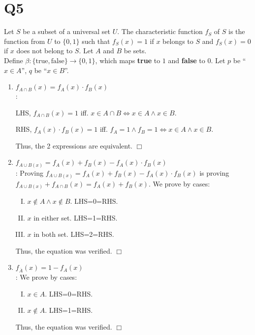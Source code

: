 \documentclass[11pt]{article}
\newenvironment{qparts}{\begin{enumerate}[{(}a{)}]}{\end{enumerate}}
\def\endproofmark{$\Box$}
\newenvironment{proof}{{\bf Proof}:}{\endproofmark\smallskip}
\begin{document}
\section*{Q5}
Let $S$ be a subset of a universal set $U$. The characteristic
function $f_S$ of $S$ is the function from $U$ to $\{0, 1\}$ such that
$f_S (x) = 1$ if $x$ belongs to $S $ and $f_S (x) = 0$ if $x$ does not belong
to $S$. Let $ A$ and $B$ be sets. 
\\
Define $\beta \colon \{ \text{true}, \text{false} \} \to \{ 0,1 \}$, which
maps \textbf{true} to $1$ and \textbf{false} to $0$.
Let $p$ be ``$x \in A$'', $q$ be ``$x \in B$''.
\begin{qparts}    
    \item $f_{A \cap B}(x)=f_{A}(x)\cdot f_{B}(x)$\\
    \begin{proof}

        LHS, $f_{A\cap B}(x)=1$ iff. $x \in A \cap B \iff x \in A \land x \in B$.

        RHS, $f_{A}(x)\cdot f_{B}(x)=1$ iff. $ f_{A}=1 \land f_{B}=1
        \iff x \in A \land x \in B$.

        Thus, the 2 expressions are equivalent.
    \end{proof}

    
    \item $f_{A \cup B(x)}=f_{A}(x)+f_{B}(x)-f_{A}(x)\cdot f_{B}(x)$\\
    \begin{proof}
        Proving $f_{A \cup B(x)}=f_{A}(x)+f_{B}(x)-f_{A}(x)\cdot f_{B}(x)$ 
        is proving $f_{A \cup B(x)}+f_{A \cap B}(x)=f_{A}(x)+f_{B}(x)$.
        We prove by cases:
        \begin{enumerate}[I.]
            
            \item $x \notin A \land x \notin B$. LHS=0=RHS.
            \item $x$ in either set. LHS=1=RHS.
            \item $x$ in both set. LHS=2=RHS.
        \end{enumerate}
        Thus, the equation was verified.
    \end{proof}
    
    \item $f_{\overline{A}}(x)=1-f_{A}(x)$\\
    \begin{proof}
        We prove by cases:
        \begin{enumerate}[I.]
            
            \item $x \in A$. LHS=0=RHS.
            
            \item $x \notin A$. LHS=1=RHS.
        \end{enumerate}
        Thus, the equation was verified.
    \end{proof}
\end{qparts}
\end{document}
